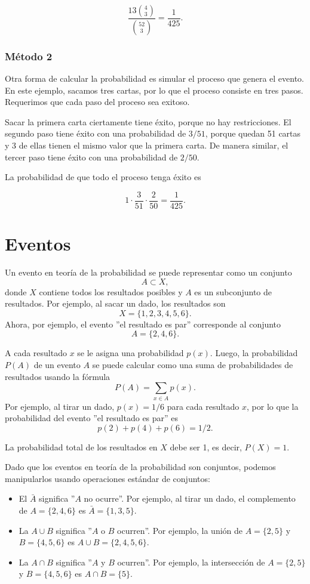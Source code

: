 \[\frac{13 {4 \choose 3}}{{52 \choose 3}} = \frac{1}{425}.\]

\subsubsection*{Método 2}

Otra forma de calcular la probabilidad es
simular el proceso que genera el evento.
En este ejemplo, sacamos tres cartas, por lo que el proceso
consiste en tres pasos.
Requerimos que cada paso del proceso sea exitoso.

Sacar la primera carta ciertamente tiene éxito,
porque no hay restricciones.
El segundo paso tiene éxito con una probabilidad de $3/51$,
porque quedan 51 cartas y 3 de ellas
tienen el mismo valor que la primera carta.
De manera similar, el tercer paso tiene éxito con una probabilidad de $2/50$.

La probabilidad de que todo el proceso tenga éxito es

\[1 \cdot \frac{3}{51} \cdot \frac{2}{50} = \frac{1}{425}.\]

\section{Eventos}

Un evento en teoría de la probabilidad se puede representar como un conjunto
\[A \subset X,\]
donde $X$ contiene todos los resultados posibles
y $A$ es un subconjunto de resultados.
Por ejemplo, al sacar un dado, los resultados son
\[X = \{1,2,3,4,5,6\}.\]
Ahora, por ejemplo, el evento ''el resultado es par''
corresponde al conjunto
\[A = \{2,4,6\}.\]

A cada resultado $x$ se le asigna una probabilidad $p(x)$.
Luego, la probabilidad $P(A)$ de un evento
$A$ se puede calcular como una suma
de probabilidades de resultados usando la fórmula
\[P(A) = \sum_{x \in A} p(x).\]
Por ejemplo, al tirar un dado,
$p(x)=1/6$ para cada resultado $x$,
por lo que la probabilidad del evento
''el resultado es par'' es
\[p(2)+p(4)+p(6)=1/2.\]

La probabilidad total de los resultados en $X$ debe
ser 1, es decir, $P(X)=1$.

Dado que los eventos en teoría de la probabilidad son conjuntos,
podemos manipularlos usando operaciones estándar de conjuntos:

\begin{itemize}
\item El  $\bar A$ significa
''$A$ no ocurre''.
Por ejemplo, al tirar un dado, 
el complemento de $A=\{2,4,6\}$ es
$\bar A = \{1,3,5\}$.
\item La  $A \cup B$ significa
''$A$ o $B$ ocurren''.
Por ejemplo, la unión de
$A=\{2,5\}$
y $B=\{4,5,6\}$ es
$A \cup B = \{2,4,5,6\}$.
\item La  $A \cap B$ significa
''$A$ y $B$ ocurren''.
Por ejemplo, la intersección de
$A=\{2,5\}$ y $B=\{4,5,6\}$ es
$A \cap B = \{5\}$.
\end{itemize}

